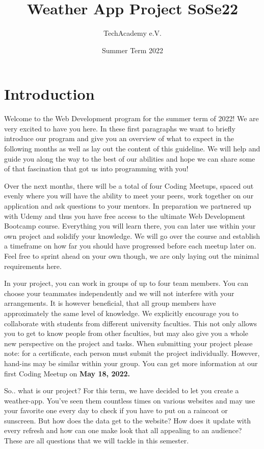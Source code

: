 \documentclass[
]{book}
\title{Weather App Project SoSe22}
\author{TechAcademy e.V.}
\date{Summer Term 2022}
\begin{document}
\maketitle

{
\setcounter{tocdepth}{1}
\tableofcontents
}
\hypertarget{introduction}{%
\chapter{Introduction}\label{introduction}}

Welcome to the Web Development program for the summer term of 2022! We are very excited to have you here. In these first paragraphs we want to briefly introduce our program and give you an overview of what to expect in the following months as well as lay out the content of this guideline. We will help and guide you along the way to the best of our abilities and hope we can share some of that fascination that got us into programming with you!

Over the next months, there will be a total of four Coding Meetups, spaced out evenly where you will have the ability to meet your peers, work together on our application and ask questions to your mentors. In preparation we partnered up with Udemy and thus you have free access to the ultimate Web Development Bootcamp course. Everything you will learn there, you can later use within your own project and solidify your knowledge. We will go over the course and establish a timeframe on how far you should have progressed before each meetup later on. Feel free to sprint ahead on your own though, we are only laying out the minimal requirements here.

In your project, you can work in groups of up to four team members. You can choose your teammates independently and we will not interfere with your arrangements. It is however beneficial, that all group members have approximately the same level of knowledge. We explicitly encourage you to collaborate with students from different university faculties. This not only allows you to get to know people from other faculties, but may also give you a whole new perspective on the project and tasks. When submitting your project please note: for a certificate, each person must submit the project individually. However, hand-ins may be similar within your group. You can get more information at our first Coding Meetup on \textbf{May 18, 2022.}

So.. what is our project? For this term, we have decided to let you create a weather-app. You've seen them countless times on various websites and may use your favorite one every day to check if you have to put on a raincoat or sunscreen. But how does the data get to the website? How does it update with every refresh and how can one make look that all appealing to an audience? These are all questions that we will tackle in this semester.
\end{document}
